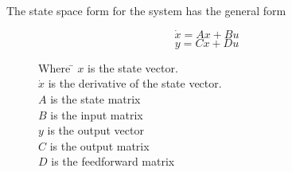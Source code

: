 \documentclass{article}
\begin{document}
The state space form for the system has the general form 
\begin{figure}[h]

\begin{equation}
\dot{x}=Ax+Bu
\end{equation}
\begin{equation}
y=Cx+Du
\end{equation}
\begin{tabbing}
Where \= $x$ is the state vector.\\
	\> $\dot{x}$ is the derivative of the state vector.\\
	\> $A$ is the state matrix\\
	\> $B$ is the input matrix\\
	\> $y$ is the output vector\\
	\> $C$ is the output matrix\\
	\> $D$ is the feedforward matrix
	
	
\end{tabbing}
\end{figure}
\end{document}
